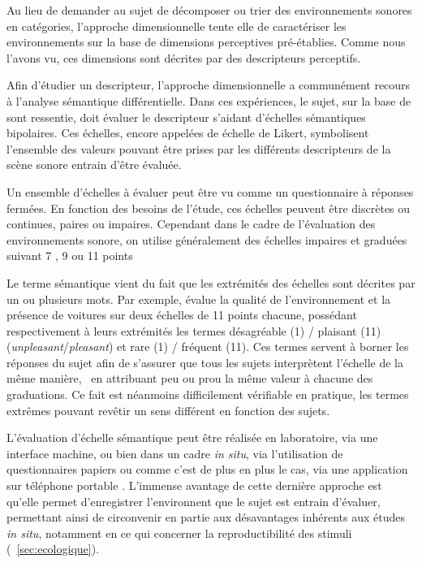 Au lieu de demander au sujet de décomposer ou trier des environnements sonores en catégories, l'approche dimensionnelle tente elle de caractériser les environnements sur la base de dimensions perceptives pré-établies. Comme nous l'avons vu, ces dimensions sont décrites par des descripteurs perceptifs.

Afin d'étudier un descripteur, l'approche dimensionnelle a communément recours à l'analyse sémantique différentielle. Dans ces expériences, le sujet, sur la base de sont ressentie, doit évaluer le descripteur s'aidant d'échelles sémantiques bipolaires. Ces échelles, encore appelées de échelle de Likert, symbolisent l'ensemble des valeurs pouvant être prises par les différents descripteurs de la scène sonore entrain d'être évaluée. 

Un ensemble d'échelles à évaluer peut être vu comme un questionnaire à réponses fermées. En fonction des besoins de l'étude, ces échelles peuvent être discrètes ou continues, paires ou impaires. Cependant dans le cadre de l'évaluation des environnements sonore, on utilise généralement des échelles impaires et graduées suivant 7 \citep{raimbault2006qualitative}, 9 \citep{hall2013exploratory} ou 11 points \citep{ricciardi2015sound}

Le terme sémantique vient du fait que les extrémités des échelles sont décrites par un ou plusieurs mots. Par exemple, \citep{ricciardi2015sound} évalue la qualité de l'environnement et la présence de voitures sur deux échelles de 11 points chacune, possédant respectivement à leurs extrémités les termes désagréable (1) / plaisant (11) (\emph{unpleasant}/\emph{pleasant}) et rare (1) / fréquent (11). Ces termes servent à borner les réponses du sujet afin de s'assurer que tous les sujets interprètent l'échelle de la même manière, \ie~en attribuant  peu ou prou la même valeur à chacune des graduations. Ce fait est néanmoins difficilement vérifiable en pratique, les termes extrêmes pouvant revêtir un sens différent en fonction des sujets.

L'évaluation d'échelle sémantique peut être réalisée en laboratoire, via une interface machine, ou bien dans un cadre \emph{in situ}, via l'utilisation de questionnaires papiers \citep{jeon2013soundwalk,torija2013application} ou comme c'est de plus en plus le cas, via une application sur téléphone portable \citep{kardous2014evaluation,ricciardi2015sound}. L'immense avantage de cette dernière approche est qu'elle permet d'enregistrer l'environnent que le sujet est entrain d'évaluer, permettant ainsi de circonvenir en partie aux désavantages inhérents aux études \emph{in situ}, notamment en ce qui concerner la reproductibilité des stimuli (\Cf~\ref{sec:ecologique}).

